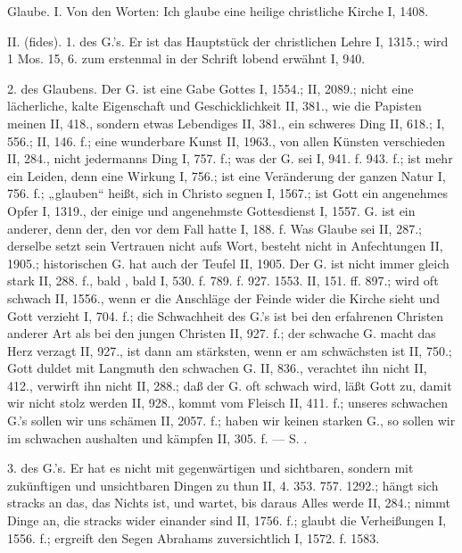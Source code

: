 Glaube. I.  Von den Worten: Ich glaube eine heilige christliche Kirche I, 1408.

II.  (fides). 1.  des G.’s. Er ist das Hauptstück der christlichen Lehre I, 1315.; wird 1 Mos. 15, 6. zum erstenmal in der Schrift lobend erwähnt I, 940.

2.  des Glaubens. Der G. ist eine Gabe Gottes I, 1554.; II, 2089.; nicht eine lächerliche, kalte Eigenschaft und Geschicklichkeit II, 381., wie die Papisten meinen II, 418., sondern etwas Lebendiges II, 381., ein schweres Ding II, 618.; I, 556.; II, 146. f.; eine wunderbare Kunst II, 1963., von allen Künsten verschieden II, 284., nicht jedermanns Ding I, 757. f.; was der G. sei I, 941. f. 943. f.; ist mehr ein Leiden, denn eine Wirkung I, 756.; ist eine Veränderung der ganzen Natur I, 756. f.; „glauben“ heißt, sich in Christo segnen I, 1567.; ist Gott ein angenehmes Opfer I, 1319., der einige und angenehmste Gottesdienst I, 1557.  G. ist ein anderer, denn der, den  vor dem Fall hatte I, 188. f. Was  Glaube sei II, 287.; derselbe setzt sein Vertrauen nicht aufs Wort, besteht nicht in Anfechtungen II, 1905.; historischen G. hat auch der Teufel II, 1905. Der G. ist nicht immer gleich stark II, 288. f., bald , bald  I, 530. f. 789. f. 927. 1553. II, 151. ff. 897.; wird oft schwach II, 1556., wenn er die Anschläge der Feinde wider die Kirche sieht und Gott verzieht I, 704. f.; die Schwachheit des G.’s ist bei den erfahrenen Christen anderer Art als bei den jungen Christen II, 927. f.; der schwache G. macht das Herz verzagt II, 927., ist dann am stärksten, wenn er am schwächsten ist II, 750.; Gott duldet mit Langmuth den schwachen G. II, 836., verachtet ihn nicht II, 412., verwirft ihn nicht II, 288.; daß der G. oft schwach wird, läßt Gott zu, damit wir nicht stolz werden II, 928., kommt vom Fleisch II, 411. f.; unseres schwachen G.’s sollen wir uns schämen II, 2057. f.; haben wir keinen starken G., so sollen wir im schwachen aushalten und kämpfen II, 305. f. — S. .

3.  des G.’s. Er hat es nicht mit gegenwärtigen und sichtbaren, sondern mit zukünftigen und unsichtbaren Dingen zu thun II, 4. 353. 757. 1292.; hängt sich stracks an das, das Nichts ist, und wartet, bis daraus Alles werde II, 284.; nimmt Dinge an, die stracks wider einander sind II, 1756. f.; glaubt die Verheißungen I, 1556. f.; ergreift den Segen Abrahams zuversichtlich I, 1572. f. 1583.

